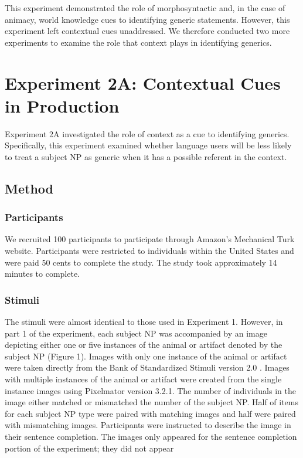 \documentclass[10pt,letterpaper]{article}
\begin{document}
This experiment demonstrated the role of morphosyntactic and, in the case of animacy, world knowledge cues to identifying generic statements. However, this experiment left contextual cues unaddressed. We therefore conducted two more experiments to examine the role that context plays in identifying generics. 

\section{Experiment 2A: Contextual Cues in Production}

Experiment 2A investigated the role of context as a cue to identifying generics. Specifically, this experiment examined whether language users will be less likely to treat a subject NP as generic when it has a possible referent in the context.

\subsection{Method}

\subsubsection{Participants} \quad We recruited 100 participants to participate through Amazon's Mechanical Turk website. Participants were restricted to individuals within the United States and were paid 50 cents to complete the study. The study took approximately 14 minutes to complete.

\subsubsection{Stimuli} \quad The stimuli were almost identical to those used in Experiment 1. However, in part 1 of the experiment, each subject NP was accompanied by an image depicting either one or five instances of the animal or artifact denoted by the subject NP (Figure 1). Images with only one instance of the animal or artifact were taken directly from the Bank of Standardized Stimuli version 2.0 \cite{Brodeur:2014}. Images with multiple instances of the animal or artifact were created from the single instance images using Pixelmator version 3.2.1. The number of individuals in the image either matched or mismatched the number of the subject NP. Half of items for each subject NP type were paired with matching images and half were paired with mismatching images. Participants were instructed to describe the image in their sentence completion. The images only appeared for the sentence completion portion of the experiment; they did not appear 
\end{document}
